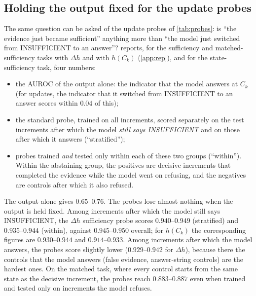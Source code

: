 \subsection{Holding the output fixed for the update probes}

The same question can be asked of the update probes of \cref{tab:probes}: is ``the evidence just became sufficient'' anything more than ``the model just switched from INSUFFICIENT to an answer''?  reports, for the sufficiency and matched-sufficiency tasks with $\Delta h$ and with $h(C_k)$ (\cref{app:rep}), and for the state-sufficiency task, four numbers:
\begin{itemize}
  \item the AUROC of the output alone: the indicator that the model answers at $C_k$ (for updates, the indicator that it switched from INSUFFICIENT to an answer scores within $0.04$ of this);
  \item the standard probe, trained on all increments, scored separately on the test increments after which the model \emph{still says INSUFFICIENT} and on those after which it answers (``stratified'');
  \item probes trained \emph{and} tested only within each of these two groups (``within''). Within the abstaining group, the positives are decisive increments that completed the evidence while the model went on refusing, and the negatives are controls after which it also refused.
\end{itemize}

\begin{table}[t]
\centering\scriptsize
\setlength{\tabcolsep}{3pt}

\caption{Sufficiency probes with the model's output held fixed (document split). Output only: AUROC of the indicator ``the model answers at $C_k$''. All: standard probe, all test increments. Stratified: the same probe on the test increments after which the model abstains (resp.\ answers). Within: probe trained and tested only on that group, layer re-selected by grouped inner cross-validation. The state-sufficiency rows are not count-matched (see \cref{tab:verbal_internal} for the count-matched version).}
\label{tab:behaviour_control}
\end{table}

The output alone gives $0.65$--$0.76$. The probes lose almost nothing when the output is held fixed. Among increments after which the model still says INSUFFICIENT, the $\Delta h$ sufficiency probe scores $0.940$--$0.949$ (stratified) and $0.935$--$0.944$ (within), against $0.945$--$0.950$ overall; for $h(C_k)$ the corresponding figures are $0.930$--$0.944$ and $0.914$--$0.933$. Among increments after which the model answers, the probes score slightly lower ($0.929$--$0.942$ for $\Delta h$), because there the controls that the model answers (false evidence, answer-string controls) are the hardest ones. On the matched task, where every control starts from the same state as the decisive increment, the probes reach $0.883$--$0.887$ even when trained and tested only on increments the model refuses.

